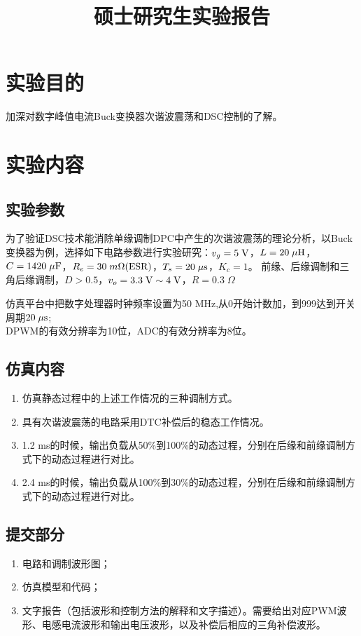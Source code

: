 \documentclass{xjtureport}
\title{硕士研究生实验报告}
\date{\zhtoday}
\begin{document}
\makecover
\makeheader
\section{实验目的}
加深对数字峰值电流Buck变换器次谐波震荡和DSC控制的了解。
\section{实验内容}
\subsection{实验参数}

为了验证DSC技术能消除单缘调制DPC中产生的次谐波震荡的理论分析，以Buck变换器为例，选择如下电路参数进行实验研究：$v_g=5 \;{\rm V}$，$L=20\;\mu{\rm H}$，$C=1420\;\mu{\rm F}$，$R_e=30\;m \Omega {\rm(ESR)}$，$T_s=20\;\mu{\rm s}$，$K_c=1$。
前缘、后缘调制和三角后缘调制，$D>0.5$，$v_o=3.3\;{\rm V}\sim4\;{\rm V}$，$R=0.3\;\Omega$

仿真平台中把数字处理器时钟频率设置为50 MHz,从0开始计数加，到999达到开关周期$20\;\mu{\rm s}$;\\DPWM的有效分辨率为10位，ADC的有效分辨率为8位。
\subsection{仿真内容}
\begin{enumerate}
    \item 仿真静态过程中的上述工作情况的三种调制方式。
    \label{仿真内容1}
    \item 具有次谐波震荡的电路采用DTC补偿后的稳态工作情况。
     \label{仿真内容2}
    \item 1.2 ms的时候，输出负载从50\%到100\%的动态过程，分别在后缘和前缘调制方式下的动态过程进行对比。
     \label{仿真内容3}
    \item 2.4 ms的时候，输出负载从100\%到30\%的动态过程，分别在后缘和前缘调制方式下的动态过程进行对比。
     \label{仿真内容4}
\end{enumerate}

\subsection{提交部分}
\begin{enumerate}
    \item 电路和调制波形图；
    \item 仿真模型和代码；
    \item 文字报告（包括波形和控制方法的解释和文字描述）。需要给出对应PWM波形、电感电流波形和输出电压波形，以及补偿后相应的三角补偿波形。
\end{enumerate}
\end{document}
